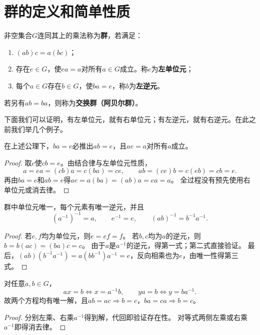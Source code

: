 \section{群的定义和简单性质}
\begin{definition}
\label{p2:concept:c1-l52}非空集合$G$连同其上的乘法称为\textbf{群}，若满足：
\begin{enumerate}
\item $(ab)c=a(bc)$；
\item {}\label{p2:concept:c1-l55}存在$e\in G$，使$ea=a$对所有$a\in G$成立。称$e$为\textbf{左单位元}；
\item {}\label{p2:concept:c1-l56}每个$a\in G$存在$b\in G$，使$ba=e$，称$b$为\textbf{左逆元}。
\end{enumerate}


\label{p2:concept:c1-l60}若另有$ab=ba$，则称为\textbf{交换群（阿贝尔群）}。
\end{definition}
下面我们可以证明，有左单位元，就有右单位元；有左逆元，就有右逆元。在此之前我们举几个例子。

\begin{proposition}
在上述公理下，$ba=e$必推出$ab=e$，且$ae=a$对所有$a$成立。
\end{proposition}
\begin{proof}
取$c$使$cb=e$。由结合律与左单位元性质，
\[
a=ea=(cb)a=c(ba)=ce,
\qquad ab=(ce)b=c(eb)=cb=e.
\]
再由$ba=e$和$ab=e$得$ae=a(ba)=(ab)a=ea=a$。
全过程没有预先使用右单位元或消去律。
\end{proof}

\begin{proposition}
群中单位元唯一，每个元素有唯一逆元，并且
\[
(a^{-1})^{-1}=a,\qquad e^{-1}=e,\qquad (ab)^{-1}=b^{-1}a^{-1}.
\]
\end{proposition}
\begin{proof}
若$e,f$均为单位元，则$e=ef=f$。
若$b,c$均为$a$的逆元，则$b=b(ac)=(ba)c=c$。
由于$a$是$a^{-1}$的逆元，得第一式；第二式直接验证。
最后，$(ab)(b^{-1}a^{-1})=a(bb^{-1})a^{-1}=e$，反向相乘也为$e$，由唯一性得第三式。
\end{proof}

\begin{proposition}
对任意$a,b\in G$，
\[
ax=b\iff x=a^{-1}b,\qquad ya=b\iff y=ba^{-1}.
\]
故两个方程均有唯一解，且$ab=ac\Rightarrow b=c$，$ba=ca\Rightarrow b=c$。
\end{proposition}
\begin{proof}
分别左乘、右乘$a^{-1}$得到解，代回即验证存在性。
对等式两侧左乘或右乘$a^{-1}$即得消去律。
\end{proof}



